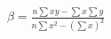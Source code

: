 \documentclass{article}
\begin{document}
	\begin{math}
	\beta = \frac{n \sum{xy}-\sum{x}\sum{y}}{n \sum{x^2}-(\sum{x})^2}
	\end{math}
\end{document}
